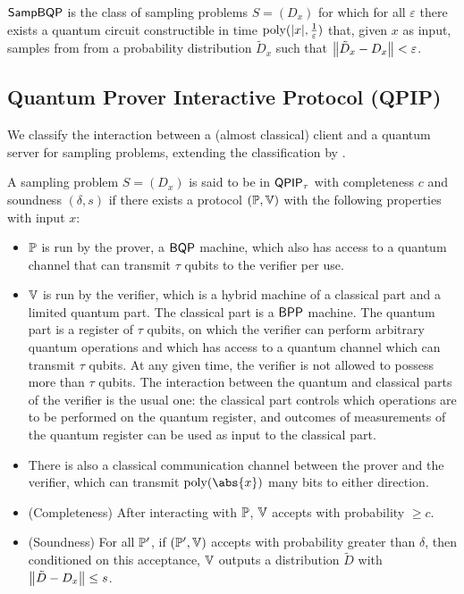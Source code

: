  

\begin{definition} [$\SampBQP$]
	$\SampBQP$ is the class of sampling problems $S=(D_x)$ for which for all $\varepsilon$ there exists a quantum circuit constructible in time $\operatorname*{\operatorname{poly}}(|x|, \frac{1}{\varepsilon})$ that, given $x$ as input, samples from from a probability distribution $\tilde{D}_x$ such that $\left\lVert\tilde{D}_x-D_x\right\rVert<\varepsilon$.
\end{definition}

\subsection{Quantum Prover Interactive Protocol (QPIP)}
We classify the interaction between a (almost classical) client and a quantum server for sampling problems, extending the classification by \cite{mahadev_delegation}.

\begin{definition}
	A sampling problem $S=(D_x)$ is said to be in $\operatorname{\mathsf{QPIP}}_\tau$ with completeness $c$ and soundness $(\delta, s)$ if there exists a protocol $(\mathbb{P}, \mathbb{V})$ with the following properties with input $x$:
	\begin{itemize}
		\item $\mathbb{P}$ is run by the prover, a $\operatorname{\mathsf{BQP}}$ machine, which also has access to a quantum channel that can transmit $\tau$ qubits to the verifier per use.
		\item $\mathbb{V}$ is run by the verifier, which is a hybrid machine of a classical part and a limited quantum part. The classical part is a $\operatorname{\mathsf{BPP}}$ machine. The quantum part is a register of $\tau$ qubits, on which the verifier can perform arbitrary quantum operations and which has access to a quantum channel which can transmit $\tau$ qubits. At any given time, the verifier is not allowed to possess more than $\tau$ qubits. The interaction between the quantum and classical parts of the verifier is the usual one: the classical part controls which operations are to be performed on the quantum register, and outcomes of measurements of the quantum register can be used as input to the classical part.
		\item There is also a classical communication channel between the prover and the verifier, which can transmit $\poly(\abs{x})$ many bits to either direction. 
		\item (Completeness) After interacting with $\mathbb{P}$, $\mathbb{V}$ accepts with probability $\geq c$.
		\item (Soundness) For all $\mathbb{P}'$, if $(\mathbb{P}', \mathbb{V})$ accepts with probability greater than $\delta$, then conditioned on this acceptance, $\mathbb{V}$ outputs a distribution $\tilde{D}$ with $\left\lVert\tilde{D}-D_x\right\rVert\leq s$.
	\end{itemize}
\end{definition}

